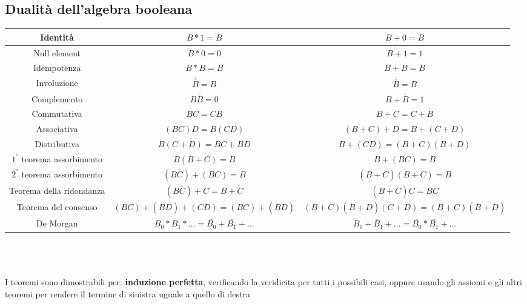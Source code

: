 \documentclass{report}
\newcommand{\n}[1]{\overline{#1}}
\begin{document}
    \subsection{Dualità dell'algebra booleana}
        \noindent\setlength\tabcolsep{4pt}
        \def\arraystretch{2}
        \hspace*{-3.3\leftmargin}\begin{tabularx}{1.492\linewidth}{|c|c|c|}
            \hline
            Identità & $B * 1 = B$ & $B + 0 = B$ \\
            \hline
            Null element & $B * 0 = 0$ & $B + 1 = 1$ \\
            \hline
            Idempotenza & $B * B = B$ & $B + B = B$ \\
            \hline
            Involuzione & $\n{\n{B}} = B$ & $\n{\n{B}}= B$ \\
            \hline
            Complemento & $B\n{B} = 0$ & $B + \n{B} = 1$ \\
            \hline
            Commutativa & $BC = CB$ & $B + C = C + B$ \\
            \hline
            Associativa & $\left(BC\right)D = B\left(CD\right)$ & $\left(B + C\right) + D = B + \left(C + D\right)$ \\
            \hline
            Distributiva & $B\left(C + D\right) = BC + BD$ & $B + \left(CD\right) = \left(B + C\right)\left(B + D\right)$ \\
            \hline
            $1^{°}$ teorema assorbimento & $B\left(B + C\right) = B$ & $B + \left(BC\right) = B$ \\
            \hline
            $2^{°}$ teorema assorbimento & $\left(B\n{C}\right) + \left(BC\right) = B$ & $\left(B + \n{C}\right)\left(B + C\right) = B$  \\
            \hline
            Teorema della ridondanza & $\left(B\n{C}\right) + C = B + C$ & $\left(B + \n{C}\right)C = BC$ \\
            \hline
            Teorema del consenso & $\left(BC\right) + \left(\n{B}D\right) + \left(CD\right) = \left(BC\right) + \left(\n{B}D\right)$
                & $\left(B + C\right)\left(\n{B} + D\right)\left(C + D\right) = \left(B + C\right)\left(\n{B} + D\right)$ \\
            \hline
            De Morgan & $\overline{B_0 * B_1 * ...} = \overline{B_0} + \overline{B_1} + ...$ & 
                $\overline{B_0 + B_1 + ...} = \overline{B_0} * \overline{B_1} + ...$ \\
            \hline
        \end{tabularx} \\ \\ \\
        I teoremi sono dimostrabili per: \textbf{induzione perfetta}, 
        verificando la veridicita per tutti i possibili casi, oppure usando gli assiomi
        e gli altri teoremi per rendere il termine di sinistra uguale a quello di destra 
\end{document}
